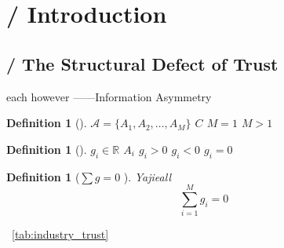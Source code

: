 \documentclass[12pt,a4paper]{article}
\newtheorem{definition}[theorem]{Definition}
\theoremstyle{remark}
\newcommand{\R}{\mathbb{R}}
\newcommand{\A}{\mathcal{A}}
\newcommand{\sumgeq}{\sum g = 0}
\newcommand{\undeclared}{\texttt{UNDECLARED}}
\begin{document}
\begin{abstract}
Any industry participant that refuses multi-verifier audit under the $\sumgeq$ constraint will have all its claims marked as \undeclared, rendering them non-tradable within the Yajie network.
We conservatively estimate the global addressable SCX audit market across six industries at approximately \$500 billion/year, with SCX-capturable share projected at \$100--250 billion/year.

\bigskip
\noindent\textbf{Keywords:}
SCX protocol, Yajie audit, multi-verifier convergence, $\sumgeq$ constraint, industry audit, trust mechanism, verifier bias, audit sovereignty, information asymmetry, UNDECLARED marking.

\end{abstract}

\section{ / Introduction}

\subsection{ / The Structural Defect of Trust}

each
however
——Information Asymmetry



\begin{definition}[]
 $\A = \{A_1, A_2, \ldots, A_M\}$  $C$  $M=1$  $M>1$ 
\end{definition}

\begin{definition}[]
 $g_i \in \R$  $A_i$ $g_i > 0$ $g_i < 0$ $g_i = 0$ 
\end{definition}

\begin{definition}[$\sumgeq$ ]
Yajieall
\begin{equation}
    \sum_{i=1}^{M} g_i = 0
\end{equation}

\end{definition}

~\ref{tab:industry_trust}
\end{document}
